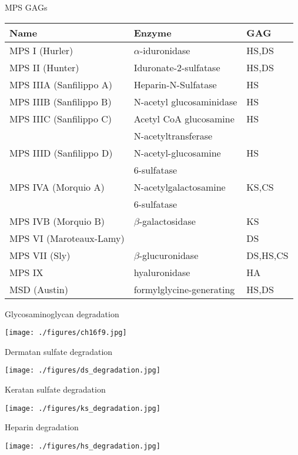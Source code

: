 \documentclass[presentation, smaller]{beamer}
\begin{document}
\begin{frame}[label={sec:org611a63f}]{MPS GAGs}
\begin{center}
\begin{tabular}{lll}
Name & Enzyme & GAG\\
\hline
MPS I (Hurler) & \(\alpha\)-iduronidase & HS,DS\\
MPS II (Hunter) & Iduronate-2-sulfatase & HS,DS\\
\hline
MPS IIIA (Sanfilippo A) & Heparin-N-Sulfatase & HS\\
MPS IIIB (Sanfilippo B) & N-acetyl glucosaminidase & HS\\
MPS IIIC (Sanfilippo C) & Acetyl CoA glucosamine & HS\\
 & N-acetyltransferase & \\
MPS IIID (Sanfilippo D) & N-acetyl-glucosamine & HS\\
 & 6-sulfatase & \\
\hline
MPS IVA (Morquio A) & N-acetylgalactosamine & KS,CS\\
 & 6-sulfatase & \\
MPS IVB (Morquio B) & \(\beta\)-galactosidase & KS\\
\hline
MPS VI (Maroteaux-Lamy) &  & DS\\
MPS VII (Sly) & \(\beta\)-glucuronidase & DS,HS,CS\\
MPS IX & hyaluronidase & HA\\
MSD (Austin) & formylglycine-generating & HS,DS\\
\end{tabular}
\end{center}
\end{frame}


\begin{frame}[label={sec:org2e3f9a5}]{Glycosaminoglycan degradation}
\begin{center}
\texttt{[image: ./figures/ch16f9.jpg]}
\label{org1713e00}
\end{center}
\end{frame}


\begin{frame}[label={sec:orgadc67de}]{Dermatan sulfate degradation}
\begin{center}
\texttt{[image: ./figures/ds\_degradation.jpg]}
\label{org848dc6f}
\end{center}
\end{frame}


\begin{frame}[label={sec:org8328f4a}]{Keratan sulfate degradation}
\begin{center}
\texttt{[image: ./figures/ks\_degradation.jpg]}
\label{org15c9c5f}
\end{center}
\end{frame}


\begin{frame}[label={sec:org9d27f56}]{Heparin degradation}
\begin{center}
\texttt{[image: ./figures/hs\_degradation.jpg]}
\label{org399b88c}
\end{center}
\end{frame}
\end{document}

